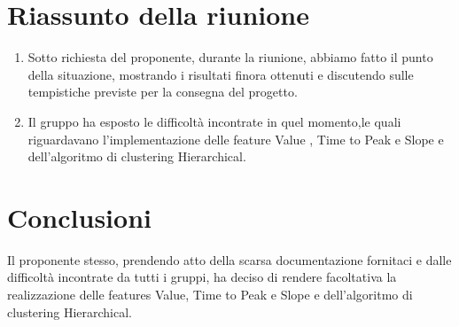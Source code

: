 \section{Riassunto della riunione}
\label{riassunto}
\begin{enumerate}
	\item Sotto richiesta del proponente, durante la riunione, abbiamo fatto il punto della situazione, mostrando i 		risultati finora ottenuti e discutendo sulle tempistiche previste per la consegna del progetto. 	
	\item Il gruppo ha esposto le difficoltà incontrate in quel momento,le quali riguardavano l'implementazione delle feature\g{} Value\g{} , Time to Peak\g{} e Slope\g{} e dell'algoritmo di clustering\g{} Hierarchical.
\end{enumerate}
\pagebreak
\section{Conclusioni}
Il proponente stesso, prendendo atto della scarsa documentazione fornitaci e dalle difficoltà incontrate da tutti i gruppi, ha deciso di rendere facoltativa la realizzazione delle features\g{} Value\g{}, Time to Peak\g{} e Slope\g{} e dell'algoritmo di clustering\g{} Hierarchical\g{}.